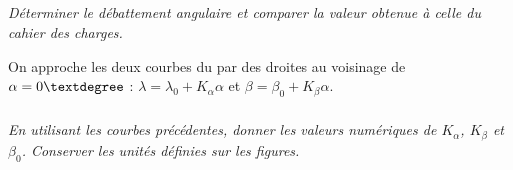 \documentclass[10pt]{article}
\newif\ifprof
\begin{document}
\subparagraph{}
\textit{Déterminer le débattement angulaire et comparer la valeur obtenue à celle du cahier des charges.}
\ifprof
\begin{corrige}

\end{corrige}
\else
\fi


On approche les deux courbes du par des droites au voisinage de $\alpha=0\textdegree$ : 
$\lambda = \lambda_0+K_\alpha \alpha$ et 
$\beta = \beta_0+K_\beta \alpha$.

\subparagraph{}
\textit{En utilisant les courbes précédentes, donner les valeurs numériques de $K_\alpha$, $K_\beta$ et $\beta_0$. Conserver les unités définies sur les figures.}
\ifprof
\begin{corrige}

\end{corrige}
\else
\fi
\end{document}
